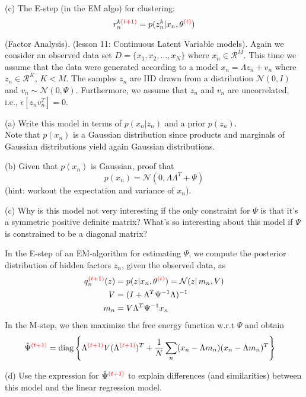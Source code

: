 \documentclass[a4paper]{article}
\newcommand{\N}{\mathcal{N}}
\newcommand{\mc}[1]{\mathcal{#1}}
\def\r#1{{\color{red}#1}}
\begin{document}
\begin{ExerciseList}
(c) The E-step (in the EM algo) for clustering:
 $$r_n^{k\r{(t+1)}} = p(z_n^k|x_n,\theta^{\r{(t)}})$$





\Exercise[label={ex:6}] (Factor Analysis). (lesson 11: Continuous Latent Variable models). 
Again we consider an observed data set $D = \{x_1,x_2,\ldots,x_N\}$ where $x_n \in \mc{R}^M$.  This time we assume that the data were generated according to a model $x_n = \Lambda z_n + v_n$ where $z_n \in \mc{R}^K$, $K<M$. The samples $z_n$ are IID drawn from a distribution $\mc{N}(0,I)$ and $v_n \sim \mc{N}(0,\Psi)$. Furthermore, we assume that $z_n$ and $v_n$ are uncorrelated, i.e., $\epsilon[z_nv_n^T]=0$.

\medskip
(a) Write this model in terms of $p(x_n|z_n)$ and a prior $p(z_n)$.\\

\medskip
Note that $p(x_n)$ is a Gaussian distribution since products and marginals of Gaussian distributions yield again Gaussian distributions.

(b) Given that $p(x_n)$ is Gaussian, proof that
$$p(x_n) = \mc{N}(0,\Lambda \Lambda^T +\Psi)$$
(hint: workout the expectation and variance of $x_n$).

(c) Why is this model not very interesting if the only constraint for $\Psi$ is that it's a symmetric positive definite matrix? What's so interesting about this model if $\Psi$ is constrained to be a diagonal matrix?

\medskip
In the E-step of an EM-algorithm for estimating $\Psi$, we compute the posterior distribution of hidden factors $z_n$, given the observed data, as
\begin{align*}
q_n^{\r{(t+1)}}(z) &= p(z|x_n,\theta^{\r{(t)}}) = \N(z|\,m_n,V)\\
    V &= (I + \Lambda^T \Psi^{-1} \Lambda)^{-1} \\
    m_n &= V \Lambda^T \Psi^{-1} x_n
    \end{align*}
In the M-step, we then maximize the free energy function w.r.t $\Psi$ and obtain
\begin{align*}
\hat \Psi^{\r{(t+1)}} &= \text{diag}\left\{\Lambda^{\r{(t+1)}} V (\Lambda^{\r{(t+1)}})^T + \frac{1}{N} \sum_n (x_n-\Lambda m_n)(x_n-\Lambda m_n)^T \right\}
\end{align*}

(d) Use the expression for $\hat \Psi^{\r{(t+1)}}$ to explain differences (and similarities) between this model and the linear regression model.




\end{ExerciseList}
\end{document}
